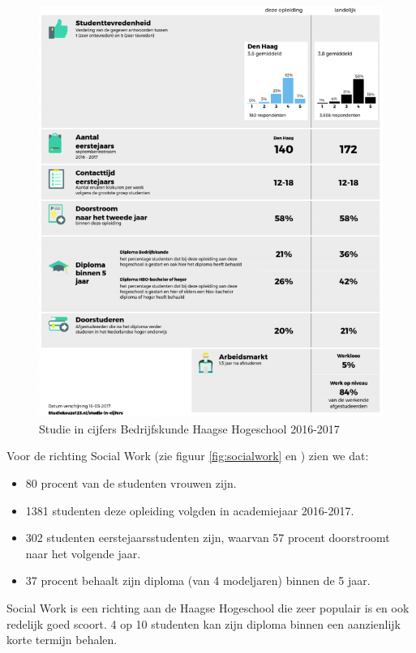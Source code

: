 \begin{figure}
	\includegraphics[width=\textwidth]
	{img/bedrijfskunde.png}
	\caption{Studie in cijfers Bedrijfskunde Haagse Hogeschool 2016-2017 \autocite{Studiekeuze2017}}
	\label{fig:bedrijfskunde}
\end{figure}

Voor de richting Social Work (zie figuur \ref{fig:socialwork} en \textcite{Studiekeuze2017}) zien we dat:
\begin{itemize}
	\item 80 procent van de studenten vrouwen zijn.
	\item 1381 studenten deze opleiding volgden in academiejaar 2016-2017.
	\item 302 studenten eerstejaarsstudenten zijn, waarvan 57 procent doorstroomt naar het volgende jaar.
	\item 37 procent behaalt zijn diploma (van 4 modeljaren) binnen de 5 jaar.
\end{itemize}

Social Work is een richting aan de Haagse Hogeschool die zeer populair is en ook redelijk goed scoort. 4 op 10 studenten kan zijn diploma binnen een aanzienlijk korte termijn behalen. 

